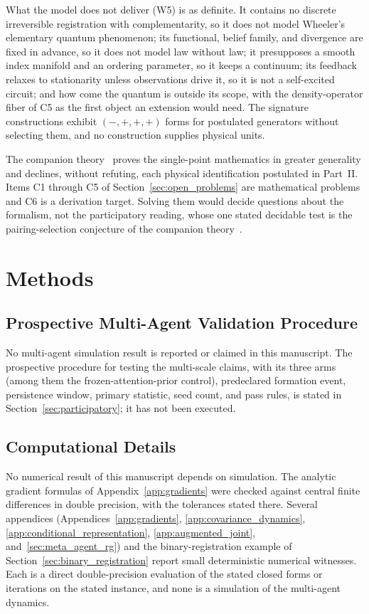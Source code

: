 \documentclass[11pt]{article}
\begin{document}
What the model does not deliver (W5) is as definite. It contains no discrete irreversible registration with complementarity, so it does not model Wheeler's elementary quantum phenomenon; its functional, belief family, and divergence are fixed in advance, so it does not model law without law; it presupposes a smooth index manifold and an ordering parameter, so it keeps a continuum; its feedback relaxes to stationarity unless observations drive it, so it is not a self-excited circuit; and how come the quantum is outside its scope, with the density-operator fiber of C5 as the first object an extension would need. The signature constructions exhibit $(-,+,+,+)$ forms for postulated generators without selecting them, and no construction supplies physical units.

The companion theory~\cite{DennisGaugeVFE2026} proves the single-point mathematics in greater generality and declines, without refuting, each physical identification postulated in Part~II. Items C1 through C5 of Section~\ref{sec:open_problems} are mathematical problems and C6 is a derivation target. Solving them would decide questions about the formalism, not the participatory reading, whose one stated decidable test is the pairing-selection conjecture of the companion theory~\cite[Ch.~14]{DennisGaugeVFE2026}.
\section{Methods}\label{sec:methods}

\subsection{Prospective Multi-Agent Validation Procedure}
\label{sec:methods_metagent}

No multi-agent simulation result is reported or claimed in this manuscript. The prospective procedure for testing the multi-scale claims, with its three arms (among them the frozen-attention-prior control), predeclared formation event, persistence window, primary statistic, seed count, and pass rules, is stated in Section~\ref{sec:participatory}; it has not been executed.

\subsection{Computational Details}

No numerical result of this manuscript depends on simulation. The analytic gradient formulas of Appendix~\ref{app:gradients} were checked against central finite differences in double precision, with the tolerances stated there. Several appendices (Appendices~\ref{app:gradients}, \ref{app:covariance_dynamics}, \ref{app:conditional_representation}, \ref{app:augmented_joint}, and~\ref{sec:meta_agent_rg}) and the binary-registration example of Section~\ref{sec:binary_registration} report small deterministic numerical witnesses. Each is a direct double-precision evaluation of the stated closed forms or iterations on the stated instance, and none is a simulation of the multi-agent dynamics.
\end{document}
